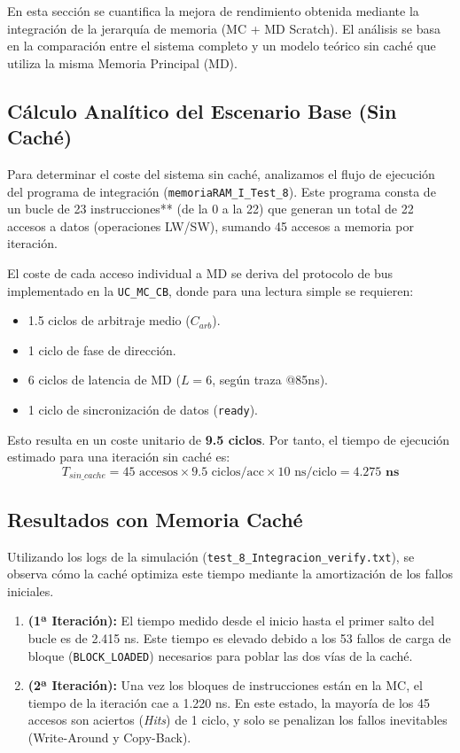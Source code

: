 \documentclass[12pt,a4paper]{article}
\begin{document}
En esta sección se cuantifica la mejora de rendimiento obtenida mediante la integración de la jerarquía de memoria (MC + MD Scratch). El análisis se basa en la comparación entre el sistema completo y un modelo teórico sin caché que utiliza la misma Memoria Principal (MD).

\subsection{Cálculo Analítico del Escenario Base (Sin Caché)}

Para determinar el coste del sistema sin caché, analizamos el flujo de ejecución del programa de integración (\texttt{memoriaRAM\_I\_Test\_8}). Este programa consta de un bucle de 23 instrucciones** (de la 0 a la 22) que generan un total de 22 accesos a datos (operaciones LW/SW), sumando 45 accesos a memoria por iteración.

\newpage 
El coste de cada acceso individual a MD se deriva del protocolo de bus implementado en la \texttt{UC\_MC\_CB}, donde para una lectura simple se requieren:
\begin{itemize}
    \item 1.5 ciclos de arbitraje medio ($C_{arb}$).
    \item 1 ciclo de fase de dirección.
    \item 6 ciclos de latencia de MD ($L=6$, según traza @85ns).
    \item 1 ciclo de sincronización de datos (\texttt{ready}).
\end{itemize}
Esto resulta en un coste unitario de \textbf{9.5 ciclos}. Por tanto, el tiempo de ejecución estimado para una iteración sin caché es:
\begin{equation}
    T_{sin\_cache} = 45 \text{ accesos} \times 9.5 \text{ ciclos/acc} \times 10 \text{ ns/ciclo} = \mathbf{4.275 \text{ ns}}
\end{equation}

\subsection{Resultados con Memoria Caché}

Utilizando los logs de la simulación (\texttt{test\_8\_Integracion\_verify.txt}), se observa cómo la caché optimiza este tiempo mediante la amortización de los fallos iniciales.

\begin{enumerate}
    \item \textbf{(1ª Iteración):} El tiempo medido desde el inicio hasta el primer salto del bucle es de 2.415 ns. Este tiempo es elevado debido a los 53 fallos de carga de bloque (\texttt{BLOCK\_LOADED}) necesarios para poblar las dos vías de la caché.
    \item \textbf{(2ª Iteración):} Una vez los bloques de instrucciones están en la MC, el tiempo de la iteración cae a 1.220 ns. En este estado, la mayoría de los 45 accesos son aciertos (\textit{Hits}) de 1 ciclo, y solo se penalizan los fallos inevitables (Write-Around y Copy-Back).
\end{enumerate}
\end{document}

